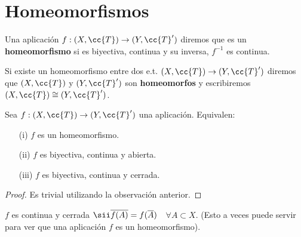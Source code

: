 \section{Homeomorfismos}

\begin{definicion}
    Una aplicación $f:(X, \cc{T})\to (Y, \cc{T}')$ diremos que es un \textbf{homeomorfismo} si es biyectiva, continua y su inversa, $f^{-1}$ es continua.

    Si existe un homeomorfismo entre dos e.t. $(X, \cc{T})\to (Y, \cc{T}')$ diremos que $(X, \cc{T})$ y $(Y, \cc{T}')$ son \textbf{homeomorfos} y escribiremos $(X, \cc{T}) \cong (Y, \cc{T}')$.
    \endsquare
\end{definicion}

\begin{teo}
    Sea $f:(X, \cc{T})\to (Y, \cc{T}')$ una aplicación. Equivalen:
    \begin{enumerate}
        \item[(i)] $f$ es un homeomorfismo.
        \item[(ii)] $f$ es biyectiva, continua y abierta.
        \item[(iii)] $f$ es biyectiva, continua y cerrada.  
    \end{enumerate}
    \begin{proof}
        Es trivial utilizando la observación anterior.

    \end{proof}
\end{teo}

\begin{observacion}
    $f$ es continua y cerrada $\sii \overline{f(A)}=f(\overline{A})$\ \ $\forall A \subset X$. (Esto a veces puede servir para ver que una aplicación $f$ es un homeomorfismo).
    \endsquare
\end{observacion}

